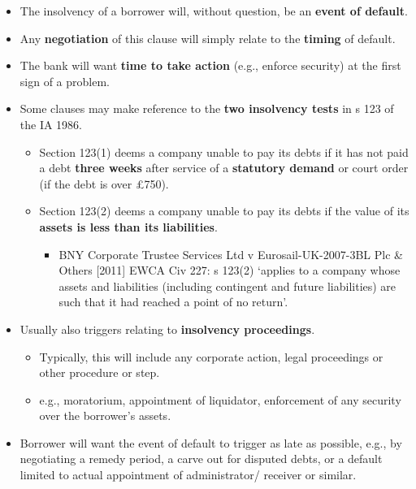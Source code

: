\documentclass[
]{article}
\providecommand{\tightlist}{%
  \setlength{\itemsep}{0pt}\setlength{\parskip}{0pt}}
\begin{document}
\begin{itemize}
\tightlist
\item
  The insolvency of a borrower will, without question, be an
  \textbf{event of default}.
\item
  Any \textbf{negotiation} of this clause will simply relate to the
  \textbf{timing} of default.
\item
  The bank will want \textbf{time to take action} (e.g., enforce
  security) at the first sign of a problem.
\item
  Some clauses may make reference to the \textbf{two insolvency tests}
  in s 123 of the IA 1986.

  \begin{itemize}
  \tightlist
  \item
    Section 123(1) deems a company unable to pay its debts if it has not
    paid a debt \textbf{three weeks} after service of a
    \textbf{statutory demand} or court order (if the debt is over £750).
  \item
    Section 123(2) deems a company unable to pay its debts if the value
    of its \textbf{assets is less than its liabilities}.

    \begin{itemize}
    \tightlist
    \item
      BNY Corporate Trustee Services Ltd v Eurosail-UK-2007-3BL Plc \&
      Others {[}2011{]} EWCA Civ 227: s 123(2) `applies to a company
      whose assets and liabilities (including contingent and future
      liabilities) are such that it had reached a point of no return'.
    \end{itemize}
  \end{itemize}
\item
  Usually also triggers relating to \textbf{insolvency proceedings}.

  \begin{itemize}
  \tightlist
  \item
    Typically, this will include any corporate action, legal proceedings
    or other procedure or step.
  \item
    e.g., moratorium, appointment of liquidator, enforcement of any
    security over the borrower's assets.
  \end{itemize}
\item
  Borrower will want the event of default to trigger as late as
  possible, e.g., by negotiating a remedy period, a carve out for
  disputed debts, or a default limited to actual appointment of
  administrator/ receiver or similar.
\end{itemize}
\end{document}
